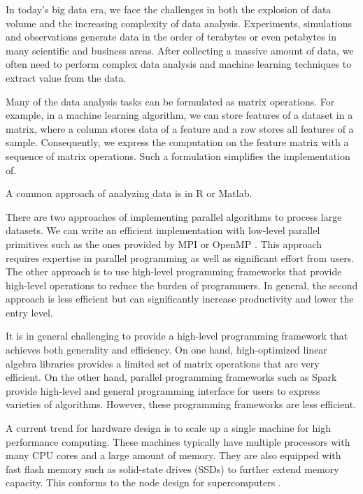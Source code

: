 
In today's big data era, we face the challenges in both the explosion of
data volume and the increasing complexity of data analysis. Experiments,
simulations and observations generate data in the order of terabytes or
even petabytes in many scientific and business areas. After collecting
a massive amount of data, we often need to perform complex data analysis
and machine learning techniques to extract value from the data.

Many of the data analysis tasks can be formulated as matrix operations.
For example, in a machine learning algorithm, we can store features of
a dataset in a matrix, where a column stores data of a feature and a row
stores all features of a sample. Consequently, we express the computation
on the feature matrix with a sequence of matrix operations. Such a formulation
simplifies the implementation of.


A common approach of analyzing data is in R or Matlab.

There are two approaches of implementing parallel algorithms to process large
datasets. We can write an efficient implementation with low-level parallel
primitives such as the ones provided by MPI \cite{mpi} or OpenMP \cite{openmp}.
This approach requires expertise in parallel programming as well as significant
effort from users. The other approach is to use high-level programming
frameworks that provide high-level operations to reduce
the burden of programmers. In general, the second approach is less efficient
but can significantly increase productivity and lower the entry level.


It is in general challenging to provide a high-level programming framework
that achieves both generality and efficiency. On one hand, high-optimized
linear algebra libraries \cite{mkl, openblas, elemental, trilinos, petsc}
provides a limited set of matrix operations that are very efficient. On the other hand,
parallel programming frameworks such as Spark \cite{spark} provide high-level
and general programming interface for users to express varieties of algorithms.
However, these programming frameworks are less efficient.


A current trend for hardware design is to scale up a single machine for high
performance computing.
These machines typically have multiple processors with many CPU cores and
a large amount of memory. They are also equipped with fast flash
memory such as solid-state drives (SSDs) to further extend memory capacity.
This conforms to the node design for supercomputers \cite{Ang14}.


